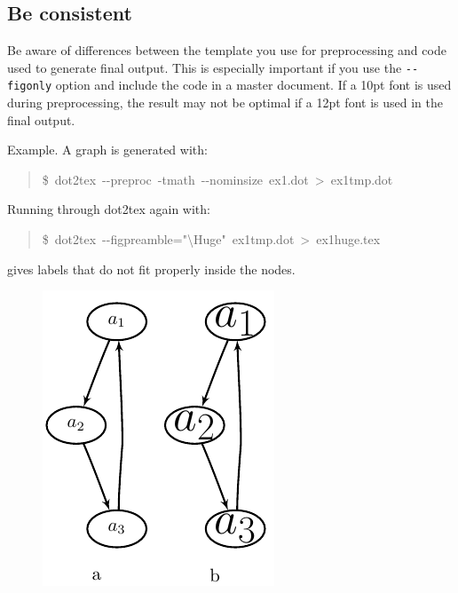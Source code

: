 \documentclass[10pt,a4paper,english]{article}
\begin{document}
\hypertarget{be-consistent}{}
\subsection*{Be consistent}
\label{be-consistent}

Be aware of differences between the template you use for preprocessing and code used to generate final output. This is especially important if you use the \texttt{-{}-figonly} option and include the code in a master document. If a 10pt font is used during preprocessing, the result may not be optimal if a 12pt font is used in the final output.

Example. A graph is generated with:
\begin{quote}{\ttfamily \raggedright \noindent
{\$}~dot2tex~-{}-preproc~-tmath~-{}-nominsize~ex1.dot~>~ex1tmp.dot
}\end{quote}

Running through dot2tex again with:
\begin{quote}{\ttfamily \raggedright \noindent
{\$}~dot2tex~-{}-figpreamble="{\textbackslash}Huge"~ex1tmp.dot~>~ex1huge.tex
}\end{quote}

gives labels that do not fit properly inside the nodes.
\begin{figure}[H]
\centering

\includegraphics{pdf/consistent}
\end{figure}



\hypertarget{postprocessing}{}
\end{document}
